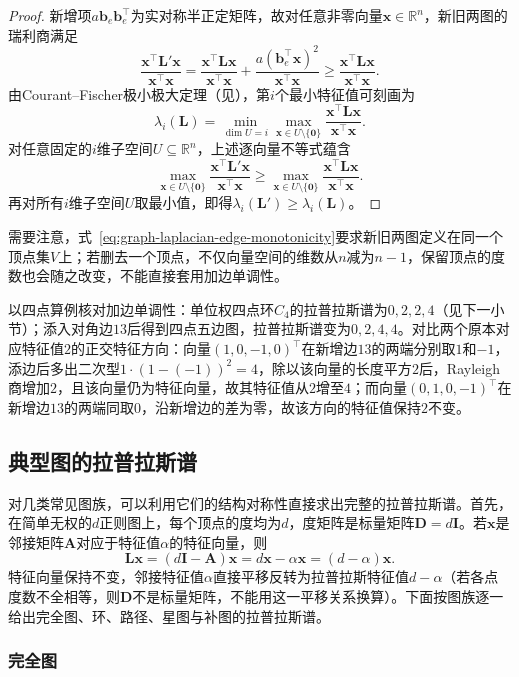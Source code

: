 \begin{proof}
新增项$a\bm b_e\bm b_e^\top$为实对称半正定矩阵，故对任意非零向量$\bm x\in\mathbb R^n$，新旧两图的瑞利商满足
\[
  \frac{\bm x^\top\bm L'\bm x}{\bm x^\top\bm x}
  =\frac{\bm x^\top\bm L\bm x}{\bm x^\top\bm x}+\frac{a(\bm b_e^\top\bm x)^2}{\bm x^\top\bm x}
  \geq \frac{\bm x^\top\bm L\bm x}{\bm x^\top\bm x}.
\]
由Courant--Fischer极小极大定理（见），第$i$个最小特征值可刻画为
\[
  \lambda_i(\bm L)=\min_{\dim U=i}\max_{\bm x\in U\setminus\{\bm 0\}}\frac{\bm x^\top\bm L\bm x}{\bm x^\top\bm x}.
\]
对任意固定的$i$维子空间$U\subseteq\mathbb R^n$，上述逐向量不等式蕴含
\[
  \max_{\bm x\in U\setminus\{\bm 0\}}\frac{\bm x^\top\bm L'\bm x}{\bm x^\top\bm x}
  \geq\max_{\bm x\in U\setminus\{\bm 0\}}\frac{\bm x^\top\bm L\bm x}{\bm x^\top\bm x}.
\]
再对所有$i$维子空间$U$取最小值，即得$\lambda_i(\bm L')\geq\lambda_i(\bm L)$。
\end{proof}

需要注意，式~\eqref{eq:graph-laplacian-edge-monotonicity}要求新旧两图定义在同一个顶点集$V$上；若删去一个顶点，不仅向量空间的维数从$n$减为$n-1$，保留顶点的度数也会随之改变，不能直接套用加边单调性。

以四点算例核对加边单调性：单位权四点环$C_4$的拉普拉斯谱为$0,2,2,4$（见下一小节）；添入对角边$13$后得到四点五边图，拉普拉斯谱变为$0,2,4,4$。对比两个原本对应特征值$2$的正交特征方向：向量$(1,0,-1,0)^\top$在新增边$13$的两端分别取$1$和$-1$，添边后多出二次型$1\cdot(1-(-1))^2=4$，除以该向量的长度平方$2$后，Rayleigh商增加$2$，且该向量仍为特征向量，故其特征值从$2$增至$4$；而向量$(0,1,0,-1)^\top$在新增边$13$的两端同取$0$，沿新增边的差为零，故该方向的特征值保持$2$不变。

\subsection{典型图的拉普拉斯谱}
\label{sec:graph-typical-laplacian-spectra}

对几类常见图族，可以利用它们的结构对称性直接求出完整的拉普拉斯谱。首先，在简单无权的$d$正则图上，每个顶点的度均为$d$，度矩阵是标量矩阵$\bm D=d\bm I$。若$\bm x$是邻接矩阵$\bm A$对应于特征值$\alpha$的特征向量，则
\[
  \bm L\bm x=(d\bm I-\bm A)\bm x=d\bm x-\alpha\bm x=(d-\alpha)\bm x.
\]
特征向量保持不变，邻接特征值$\alpha$直接平移反转为拉普拉斯特征值$d-\alpha$（若各点度数不全相等，则$\bm D$不是标量矩阵，不能用这一平移关系换算）。下面按图族逐一给出完全图、环、路径、星图与补图的拉普拉斯谱。

\subsubsection{完全图}
\label{sec:graph-complete-laplacian-spectrum}

